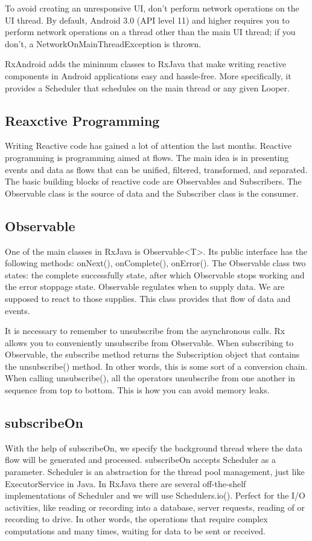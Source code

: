 \begin{framed}
	To avoid creating an unresponsive UI, don't perform network operations on the UI thread. By default, Android 3.0 (API level 11) and higher requires you to perform network operations on a thread other than the main UI thread; if you don't, a NetworkOnMainThreadException is thrown.
\end{framed}

RxAndroid adds the minimum classes to RxJava that make writing reactive components in Android applications easy and hassle-free. More specifically, it provides a Scheduler that schedules on the main thread or any given Looper. 

\subsection{Reaxctive Programming}
Writing Reactive code has gained a lot of attention the last months. Reactive programming is programming aimed at flows. The main idea is in presenting events and data as flows that can be unified, filtered, transformed, and separated. The basic building blocks of reactive code are Observables and Subscribers. The Observable class is the source of data and the Subscriber class is the consumer.

\subsection{Observable}
One of the main classes in RxJava is Observable<T>. Its public interface has the following methods: onNext(), onComplete(), onError(). The Observable class two states: the complete successfully state, after which Observable stops working and the error stoppage state. Observable regulates when to supply data. We are supposed to react to those supplies. This class provides that flow of data and events.

It is necessary to remember to unsubscribe from the asynchronous calls. Rx allows you to conveniently unsubscribe from Observable. When subscribing to Observable, the subscribe method returns the Subscription object that contains the unsubscribe() method. In other words, this is some sort of a conversion chain. When calling unsubscribe(), all the operators unsubscribe from one another in sequence from top to bottom. This is how you can avoid memory leaks.

\subsection{subscribeOn}
With the help of subscribeOn, we specify the background thread where the data flow will be generated and processed.
subscribeOn accepts Scheduler as a parameter. Scheduler is an abstraction for the thread pool management, just like ExecutorService in Java. In RxJava there are several off-the-shelf implementations of Scheduler and we will use Schedulers.io(). Perfect for the I/O activities, like reading or recording into a database, server requests, reading of or recording to drive. In other words, the operations that require complex computations and many times, waiting for data to be sent or received.

